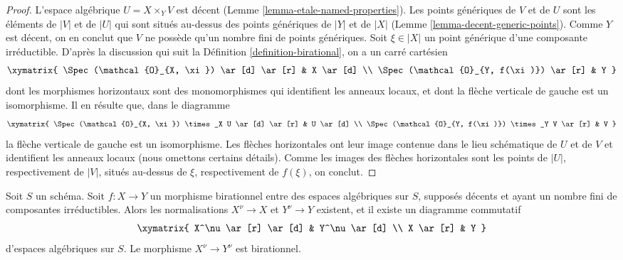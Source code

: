 \begin{proof}
L'espace algébrique $U = X \times_Y V$ est décent
(Lemme \ref{lemma-etale-named-properties}).
Les points génériques de $V$ et de $U$ sont les éléments de $|V|$ et de $|U|$
qui sont situés au-dessus des points génériques de $|Y|$ et de $|X|$
(Lemme \ref{lemma-decent-generic-points}).
Comme $Y$ est décent, on en conclut que $V$ ne possède qu'un nombre fini de
points génériques. Soit $\xi \in |X|$ un point générique d'une composante
irréductible. D'après la discussion qui suit la
Définition \ref{definition-birational}, on a un carré cartésien
$$
\xymatrix{
\Spec(\mathcal{O}_{X, \xi}) \ar[d] \ar[r] & X \ar[d] \\
\Spec(\mathcal{O}_{Y, f(\xi)}) \ar[r] & Y
}
$$
dont les morphismes horizontaux sont des monomorphismes qui identifient les
anneaux locaux, et dont la flèche verticale de gauche est un isomorphisme.
Il en résulte que, dans le diagramme
$$
\xymatrix{
\Spec(\mathcal{O}_{X, \xi}) \times_X U \ar[d] \ar[r] & U \ar[d] \\
\Spec(\mathcal{O}_{Y, f(\xi)}) \times_Y V \ar[r] & V
}
$$
la flèche verticale de gauche est un isomorphisme. Les flèches horizontales
ont leur image contenue dans le lieu schématique de $U$ et de $V$ et
identifient les anneaux locaux (nous omettons certains détails). Comme les
images des flèches horizontales sont les points de $|U|$, respectivement de
$|V|$, situés au-dessus de $\xi$, respectivement de $f(\xi)$, on conclut.
\end{proof}

\begin{lemma}
\label{lemma-birational-induced-morphism-normalizations}
Soit $S$ un schéma. Soit $f : X \to Y$ un morphisme birationnel entre des
espaces algébriques sur $S$, supposés décents et ayant un nombre fini de
composantes irréductibles. Alors les normalisations $X^\nu \to X$ et
$Y^\nu \to Y$ existent, et il existe un diagramme commutatif
$$
\xymatrix{
X^\nu \ar[r] \ar[d] &  Y^\nu \ar[d] \\
X \ar[r] & Y
}
$$
d'espaces algébriques sur $S$. Le morphisme $X^\nu \to Y^\nu$ est
birationnel.
\end{lemma}

